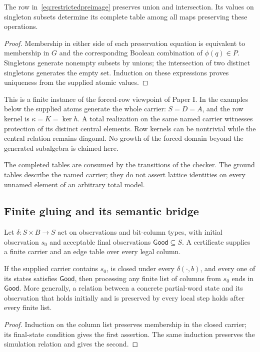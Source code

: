 \begin{lemma}\label{lem:atomiccompletion}
The row in~\eqref{eq:restrictedpreimage} preserves union and intersection. Its values on singleton subsets determine its complete table among all maps preserving these operations.
\end{lemma}
\begin{proof}
Membership in either side of each preservation equation is equivalent to membership in $G$ and the corresponding Boolean combination of $\phi(q)\in P$. Singletons generate nonempty subsets by unions; the intersection of two distinct singletons generates the empty set. Induction on these expressions proves uniqueness from the supplied atomic values.
\end{proof}

This is a finite instance of the forced-row viewpoint of Paper I. In the examples below the supplied atoms generate the whole carrier: $S=D=A$, and the row kernel is $\kappa=K=\ker h$. A total realization on the same named carrier witnesses protection of its distinct central elements. Row kernels can be nontrivial while the central relation remains diagonal. No growth of the forced domain beyond the generated subalgebra is claimed here.

The completed tables are consumed by the transitions of the checker. The ground tables describe the named carrier; they do not assert lattice identities on every unnamed element of an arbitrary total model.

\subsection{Finite gluing and its semantic bridge}
Let $\delta:S\times B\to S$ act on observations and bit-column types, with initial observation $s_0$ and acceptable final observations $\mathsf{Good}\subseteq S$. A certificate supplies a finite carrier and an edge table over every legal column.

\begin{theorem}\label{thm:gluing}
If the supplied carrier contains $s_0$, is closed under every $\delta(\cdot,b)$, and every one of its states satisfies $\mathsf{Good}$, then processing any finite list of columns from $s_0$ ends in $\mathsf{Good}$. More generally, a relation between a concrete partial-word state and its observation that holds initially and is preserved by every local step holds after every finite list.
\end{theorem}
\begin{proof}
Induction on the column list preserves membership in the closed carrier; its final-state condition gives the first assertion. The same induction preserves the simulation relation and gives the second.
\end{proof}


